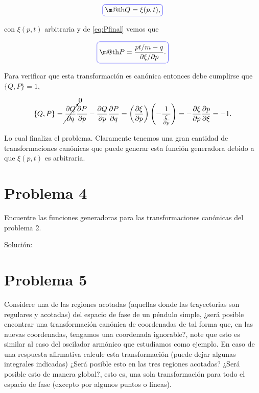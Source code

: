 \documentclass[a4paper,10pt]{article}
\makeatletter
\numberwithin{equation}{section}
\newcommand*{\boxcolor}{blue}
\renewcommand{\boxed}[1]{\textcolor{\boxcolor}{%
\tikz[baseline={([yshift=-1ex]current bounding box.center)}] \node [rectangle, minimum width=1ex,rounded corners,draw] {\normalcolor\m@th$\displaystyle#1$};}}
\makeatother
\begin{document}
\begin{equation}
  \boxed{Q = \xi(p,t),}
\end{equation}

con $\xi(p,t)$ arbitraria y de \eqref{eq:Pfinal} vemos que 

\begin{equation}
 \boxed{P = \frac{pt/m - q}{\partial \xi/\partial p}.}
\end{equation}

Para verificar que esta transformación es canónica entonces debe cumplirse que 
$\{Q,P\} = 1$, 

\begin{equation}
 \{Q,P\} = \cancelto{0}{\frac{\partial Q}{\partial q}}\frac{\partial P}{\partial p} - 
 \frac{\partial Q}{\partial p}\frac{\partial P}{\partial q} = 
 \left(\frac{\partial \xi}{\partial p}\right)\left(- \frac{1}{\frac{\xi}{\partial p}} \right) = 
 - \frac{\partial \xi}{\partial p}\frac{\partial p}{\partial \xi} = -1.
\end{equation}

Lo cual finaliza el problema. Claramente tenemos una gran cantidad de transformaciones 
canónicas que puede generar esta función generadora debido a que $\xi(p,t)$ es arbitraria.



\section{Problema 4}

Encuentre las funciones generadoras para las transformaciones canónicas del problema 
2.

\vspace{.3cm}

\underline{Solución:} \vspace{.3cm}

\section{Problema 5}

Considere una de las regiones acotadas (aquellas donde las trayectorias son regulares 
y acotadas) del espacio de fase de un péndulo simple, ¿será posible encontrar una 
transformación canónica de coordenadas de tal forma que, en las nuevas coordenadas, 
tengamos una coordenada ignorable?, note que esto es similar al caso del oscilador 
armónico que estudiamos como ejemplo. En caso de una respuesta afirmativa calcule 
esta transformación (puede dejar algunas integrales indicadas) ¿Será posible 
esto en las tres regiones acotadas? ¿Será posible esto de manera global?, esto es,
una sola transformación para todo el espacio de fase (excepto por algunos puntos o 
lineas).
\end{document}

